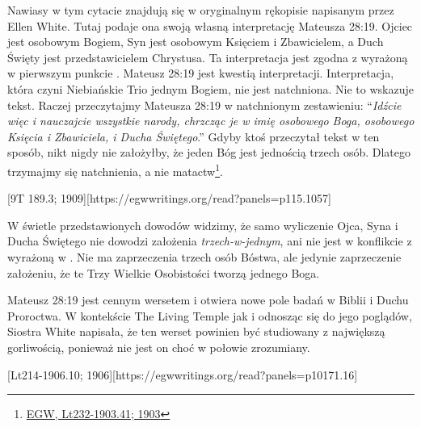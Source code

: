Nawiasy w tym cytacie znajdują się w oryginalnym rękopisie napisanym przez Ellen White. Tutaj podaje ona swoją własną interpretację Mateusza 28:19. Ojciec jest osobowym Bogiem, Syn jest osobowym Księciem i Zbawicielem, a Duch Święty jest przedstawicielem Chrystusa. Ta interpretacja jest zgodna z  wyrażoną w pierwszym punkcie . Mateusz 28:19 jest kwestią interpretacji. Interpretacja, która czyni Niebiańskie Trio jednym Bogiem, nie jest natchniona. Nie to wskazuje tekst. Raczej przeczytajmy Mateusza 28:19 w natchnionym zestawieniu: “\textit{Idźcie więc i nauczajcie wszystkie narody, chrzcząc je w imię osobowego Boga, osobowego Księcia i Zbawiciela, i Ducha Świętego}.” Gdyby ktoś przeczytał tekst w ten sposób, nikt nigdy nie założyłby, że jeden Bóg jest jednością trzech osób. Dlatego trzymajmy się natchnienia, a nie matactw\footnote{\href{https://egwwritings.org/?ref=en\_Lt232-1903.41&para=10197.50}{{EGW, Lt232-1903.41; 1903}}}.

[9T 189.3; 1909][https://egwwritings.org/read?panels=p115.1057]

W świetle przedstawionych dowodów widzimy, że samo wyliczenie Ojca, Syna i Ducha Świętego nie dowodzi założenia \textit{trzech-w-jednym}, ani nie jest w konflikcie z  wyrażoną w . Nie ma zaprzeczenia trzech osób Bóstwa, ale jedynie zaprzeczenie założeniu, że te Trzy Wielkie Osobistości tworzą jednego Boga.

Mateusz 28:19 jest cennym wersetem i otwiera nowe pole badań w Biblii i Duchu Proroctwa. W kontekście The Living Temple jak i odnosząc się do jego poglądów, Siostra White napisała, że ten werset powinien być studiowany z największą gorliwością, ponieważ nie jest on choć w  połowie zrozumiany.

[Lt214-1906.10; 1906][https://egwwritings.org/read?panels=p10171.16]

